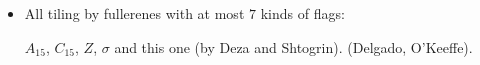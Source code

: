 \documentclass{beamer}
\begin{document}
{\begin{center}
\begin{minipage}[b]{5.0cm}
\par
\end{minipage}
\end{center}
\begin{itemize}
\item All tiling by fullerenes with at most $7$ kinds of flags:\par
$A_{15}$, $C_{15}$, $Z$, $\sigma$ and this one (by Deza and Shtogrin).
(Delgado, O'Keeffe).
\end{itemize}
}
\end{document}
